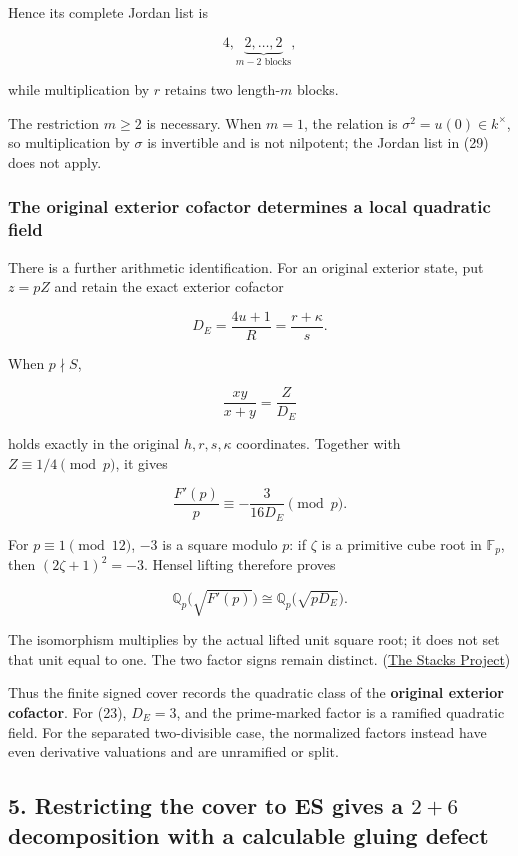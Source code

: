 Hence its complete Jordan list is

\[
\boxed{4,\underbrace{2,\ldots,2}_{m-2\text{ blocks}},}
\tag{29}
\]

while multiplication by \(r\) retains two length-\(m\) blocks.

The restriction \(m\ge2\) is necessary. When \(m=1\), the relation is
\(\sigma^2=u(0)\in k^\times\), so multiplication by \(\sigma\) is
invertible and is not nilpotent; the Jordan list in (29) does not apply.

\subsubsection{The original exterior cofactor determines a local
quadratic
field}\label{the-original-exterior-cofactor-determines-a-local-quadratic-field}

There is a further arithmetic identification. For an original exterior
state, put \(z=pZ\) and retain the exact exterior cofactor

\[
\boxed{
D_E=\frac{4u+1}{R}=\frac{r+\kappa}{s}.
}
\]

When \(p\nmid S\),

\[
\frac{xy}{x+y}=\frac Z{D_E}
\]

holds exactly in the original \(h,r,s,\kappa\) coordinates. Together
with \(Z\equiv1/4\pmod p\), it gives

\[
\boxed{
\frac{F'(p)}p\equiv-\frac3{16D_E}\pmod p.
}
\tag{30}
\]

For \(p\equiv1\pmod{12}\), \(-3\) is a square modulo \(p\): if \(\zeta\)
is a primitive cube root in \(\mathbb F_p\), then \((2\zeta+1)^2=-3\).
Hensel lifting therefore proves

\[
\boxed{
\mathbb Q_p\bigl(\sqrt{F'(p)}\bigr)
\cong
\mathbb Q_p\bigl(\sqrt{pD_E}\bigr).
}
\tag{31}
\]

The isomorphism multiplies by the actual lifted unit square root; it
does not set that unit equal to one. The two factor signs remain
distinct. (\href{https://stacks.math.columbia.edu/tag/04GE}{The Stacks
Project})

Thus the finite signed cover records the quadratic class of the
\textbf{original exterior cofactor}. For (23), \(D_E=3\), and the
prime-marked factor is a ramified quadratic field. For the separated
two-divisible case, the normalized factors instead have even derivative
valuations and are unramified or split.

\subsection{\texorpdfstring{5. Restricting the cover to ES gives a
\(2+6\) decomposition with a calculable gluing
defect}{5. Restricting the cover to ES gives a 2+6 decomposition with a calculable gluing defect}}\label{restricting-the-cover-to-es-gives-a-26-decomposition-with-a-calculable-gluing-defect}

